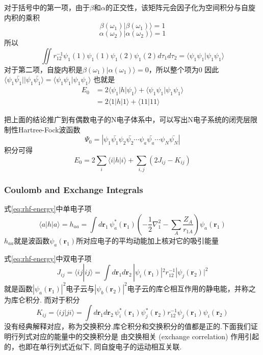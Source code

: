 \documentclass[fontset=none,12pt,a4paper]{ctexart}
\numberwithin{equation}{section}
\begin{document}
对于括号中的第一项，由于$\beta$和$\alpha$的正交性，该矩阵元会因子化为空间积分与自旋内积的乘积
\begin{equation}
  \beta(\omega_1)|\beta(\omega_1)\rangle =1 
\end{equation}
\begin{equation}
  \alpha(\omega_2)|\alpha(\omega_2)\rangle =1
\end{equation}
所以
\begin{equation}
  \iint r_{12}^{-1}\psi_1(1)\psi_1(1)\psi_1(2)\psi_1(2)d\tau_1d\tau_2=\langle \psi_1\psi_1|\psi_1\psi_1\rangle
\end{equation}
对于第二项，自旋内积是$\beta(\omega_1)|\alpha(\omega_1)\rangle=0$，所以整个项为0
因此$\langle \psi_1\bar{\psi_1}||\psi_1\bar{\psi_1}\rangle=\langle \psi_1\psi_1|\psi_1\psi_1\rangle$
也就是
\begin{equation}
  \begin{aligned}
  E_0&=2\langle\psi_1|h|\psi_1\rangle+\langle\psi_1\psi_1|\psi_1\psi_1\rangle \\
     &=2\langle 1|h|1\rangle+\langle 11|11\rangle
  \end{aligned}
\end{equation}

把上面的结论推广到有偶数电子的N电子体系中，可以写出N电子系统的闭壳层限制性Hartree-Fock波函数
\begin{equation}
  \Psi_0=|\psi_1\bar{\psi_1}\psi_2\bar{\psi_2}\cdots\psi_a\bar{\psi_a}\cdots\psi_N\bar{\psi_N}|
\end{equation}
积分可得
\begin{equation}
  E_0=2\sum_i\langle i|h|i\rangle+\sum_{i,j}(2J_{ij}-K_{ij})
  \label{eq:rhf-energy}
\end{equation}
\subsubsection{Coulomb and Exchange Integrals}
式\eqref{eq:rhf-energy}中单电子项
\begin{equation}
  \langle a|h|a\rangle=h_{aa}=\int d\mathbf{r}_1\,\psi_a^*(\mathbf{r}_1)\left(-\frac{1}{2}\nabla_1^2-\sum_{A}\frac{Z_A}{r_{1A}}\right)\psi_a(\mathbf{r}_1)
\end{equation}
$h_{aa}$就是波函数$\psi_a(\mathbf{r}_1)$所对应电子的平均动能加上核对它的吸引能量

式\eqref{eq:rhf-energy}中双电子项
\begin{equation}
  J_{ij}=\langle ij|ij\rangle =
  \int d\mathbf{r}_1 d\mathbf{r}_2\,|\psi_i(\mathbf{r}_1)|^2 r_{12}^{-1} |\psi_j(\mathbf{r}_2)|^2
\end{equation}
就是函数$|\psi_a(\mathbf{r}_1)|^2$电子云与$|\psi_b(\mathbf{r}_2)|^2$电子云的库仑相互作用的静电能，并称之为库仑积分.
而对于积分
\begin{equation}
  K_{ij}=\langle ij|ji\rangle =  \int d\mathbf{r}_1 d\mathbf{r}_2\,\psi_i^*(\mathbf{r}_1)\psi_j^*(\mathbf{r}_2) r_{12}^{-1} \psi_j(\mathbf{r}_1)\psi_i(\mathbf{r}_2)
\end{equation}
没有经典解释对应，称为交换积分.库仑积分和交换积分的值都是正的.下面我们证明行列式对应的能量中的交换积分是
由交换相关 (exchange correlation) 作用引起的，也即在单行列式近似下, 同自旋电子的运动相互关联.
\end{document}
